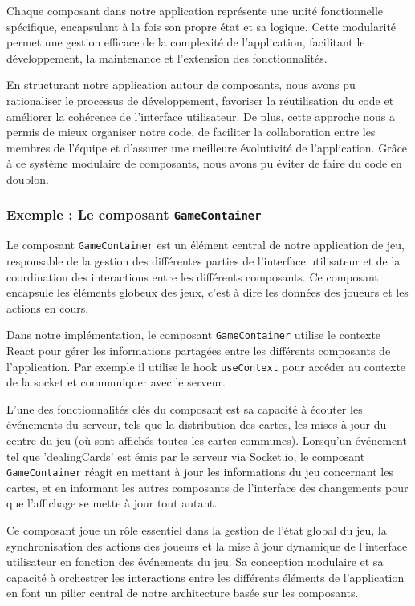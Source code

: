 \documentclass[a4paper]{article}
\begin{document}
Chaque composant dans notre application représente une unité fonctionnelle spécifique, encapsulant à la fois son propre état et sa logique. Cette modularité permet une gestion efficace de la complexité de l'application, facilitant le développement, la maintenance et l'extension des fonctionnalités.

En structurant notre application autour de composants, nous avons pu rationaliser le processus de développement, favoriser la réutilisation du code et améliorer la cohérence de l'interface utilisateur. De plus, cette approche nous a permis de mieux organiser notre code, de faciliter la collaboration entre les membres de l'équipe et d'assurer une meilleure évolutivité de l'application. Grâce à ce système modulaire de composants, nous avons pu éviter de faire du code en doublon.

\subsubsection{Exemple : Le composant \texttt{GameContainer}}

Le composant \texttt{GameContainer} est un élément central de notre application de jeu, responsable de la gestion des différentes parties de l'interface utilisateur et de la coordination des interactions entre les différents composants. Ce composant encapsule les éléments globeux des jeux, c'est à dire les données des joueurs et les actions en cours.

Dans notre implémentation, le composant \texttt{GameContainer} utilise le contexte React pour gérer les informations partagées entre les différents composants de l'application. Par exemple il utilise le hook \texttt{useContext} pour accéder au contexte de la socket et communiquer avec le serveur.

L'une des fonctionnalités clés du composant est sa capacité à écouter les événements du serveur, tels que la distribution des cartes, les mises à jour du centre du jeu (où sont affichés toutes les cartes communes). Lorsqu'un événement tel que 'dealingCards' est émis par le serveur via Socket.io, le composant \texttt{GameContainer} réagit en mettant à jour les informations du jeu concernant les cartes, et en informant les autres composants de l'interface des changements pour que l'affichage se mette à jour tout autant.

Ce composant joue un rôle essentiel dans la gestion de l'état global du jeu, la synchronisation des actions des joueurs et la mise à jour dynamique de l'interface utilisateur en fonction des événements du jeu. Sa conception modulaire et sa capacité à orchestrer les interactions entre les différents éléments de l'application en font un pilier central de notre architecture basée sur les composants.
\end{document}
